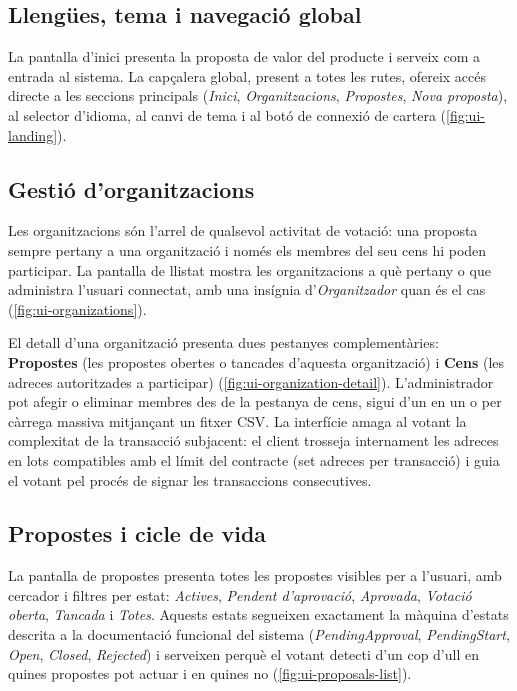 \subsection{Llengües, tema i navegació global}
\label{subsec:llengues-tema-i-navegacio-global}

La pantalla d'inici presenta la proposta de valor del producte i serveix com a entrada al sistema.
La capçalera global, present a totes les rutes, ofereix accés directe a les seccions principals (\textit{Inici},
\textit{Organitzacions}, \textit{Propostes}, \textit{Nova proposta}), al selector d'idioma, al canvi de tema i al botó
de connexió de cartera (\autoref{fig:ui-landing}).

\subsection{Gestió d'organitzacions}
\label{subsec:gestio-d'organitzacions2}

Les organitzacions són l'arrel de qualsevol activitat de votació: una proposta sempre pertany a una organització i només
els membres del seu cens hi poden participar.
La pantalla de llistat mostra les organitzacions a què pertany o que administra l'usuari connectat, amb una insígnia
d'\textit{Organitzador} quan és el cas (\autoref{fig:ui-organizations}).

El detall d'una organització presenta dues pestanyes complementàries: \textbf{Propostes} (les propostes obertes o
tancades d'aquesta organització) i \textbf{Cens} (les adreces autoritzades a participar)
(\autoref{fig:ui-organization-detail}).
L'administrador pot afegir o eliminar membres des de la pestanya de cens, sigui d'un en un o per càrrega massiva
mitjançant un fitxer \ac{CSV}.
La interfície amaga al votant la complexitat de la transacció subjacent: el client trosseja internament les adreces en
lots compatibles amb el límit del contracte (set adreces per transacció) i guia el votant pel procés de signar les
transaccions consecutives.

\subsection{Propostes i cicle de vida}
\label{subsec:propostes-i-cicle-de-vida}

La pantalla de propostes presenta totes les propostes visibles per a l'usuari, amb cercador i filtres per estat:
\textit{Actives}, \textit{Pendent d'aprovació}, \textit{Aprovada}, \textit{Votació oberta}, \textit{Tancada} i
\textit{Totes}.
Aquests estats segueixen exactament la màquina d'estats descrita a la documentació funcional del sistema
(\textit{PendingApproval}, \textit{PendingStart}, \textit{Open}, \textit{Closed}, \textit{Rejected}) i serveixen perquè
el votant detecti d'un cop d'ull en quines propostes pot actuar i en quines no (\autoref{fig:ui-proposals-list}).

